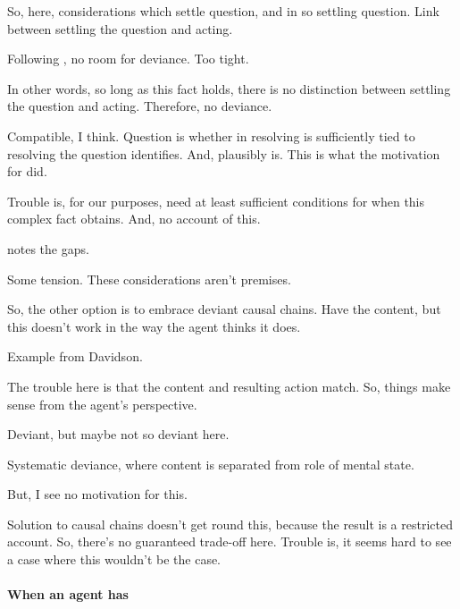 \begin{note}
  So, here, considerations which settle question, and in so settling question.
  Link between settling the question and acting.

  Following \citeauthor{Hieronymi:2011aa}, no room for deviance.
  Too tight.

  In other words, so long as this fact holds, there is no distinction between settling the question and acting.
  Therefore, no deviance.

  Compatible, I think.
  Question is whether in resolving \qzS{} is sufficiently tied to resolving the question \citeauthor{Hieronymi:2011aa} identifies.
  And, plausibly is.
  This is what the motivation for \qzS{} did.

  Trouble is, for our purposes, need at least sufficient conditions for when this complex fact obtains.
  And, no account of this.

  \citeauthor{Hieronymi:2011aa} notes the gaps.

  Some tension.
  These considerations aren't premises.
\end{note}

\begin{note}
  So, the other option is to embrace deviant causal chains.
  Have the content, but this doesn't work in the way the agent thinks it does.

  Example from Davidson.

  The trouble here is that the content and resulting action match.
  So, things make sense from the agent's perspective.

  Deviant, but maybe not so deviant here.

  Systematic deviance, where content is separated from role of mental state.

  But, I see no motivation for this.

  Solution to causal chains doesn't get round this, because the result is a restricted account.
  So, there's no guaranteed trade-off here.
  Trouble is, it seems hard to see a case where this wouldn't be the case.
\end{note}



\paragraph{When an agent has \zS{}}

